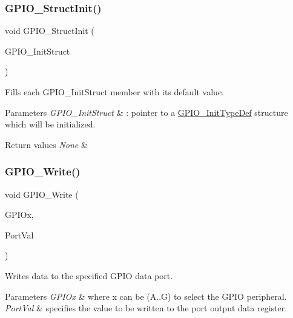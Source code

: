 \subsubsection{\texorpdfstring{GPIO\_StructInit()}{GPIO\_StructInit()}}
{\footnotesize\ttfamily void G\+P\+I\+O\+\_\+\+Struct\+Init (\begin{DoxyParamCaption}\item[{\mbox{\hyperlink{struct_g_p_i_o___init_type_def}{G\+P\+I\+O\+\_\+\+Init\+Type\+Def}} $\ast$}]{G\+P\+I\+O\+\_\+\+Init\+Struct }\end{DoxyParamCaption})}



Fills each G\+P\+I\+O\+\_\+\+Init\+Struct member with its default value. 


\begin{DoxyParams}{Parameters}
{\em G\+P\+I\+O\+\_\+\+Init\+Struct} & \+: pointer to a \mbox{\hyperlink{struct_g_p_i_o___init_type_def}{G\+P\+I\+O\+\_\+\+Init\+Type\+Def}} structure which will be initialized. \\
\hline
\end{DoxyParams}

\begin{DoxyRetVals}{Return values}
{\em None} & \\
\hline
\end{DoxyRetVals}
\mbox{\label{group___g_p_i_o___private___functions_gaa925f19c8547a00c7a0c269a84873bf9}} 
\subsubsection{\texorpdfstring{GPIO\_Write()}{GPIO\_Write()}}
{\footnotesize\ttfamily void G\+P\+I\+O\+\_\+\+Write (\begin{DoxyParamCaption}\item[{\mbox{\hyperlink{struct_g_p_i_o___type_def}{G\+P\+I\+O\+\_\+\+Type\+Def}} $\ast$}]{G\+P\+I\+Ox,  }\item[{uint16\+\_\+t}]{Port\+Val }\end{DoxyParamCaption})}



Writes data to the specified G\+P\+IO data port. 


\begin{DoxyParams}{Parameters}
{\em G\+P\+I\+Ox} & where x can be (A..G) to select the G\+P\+IO peripheral. \\
\hline
{\em Port\+Val} & specifies the value to be written to the port output data register. \\
\hline
\end{DoxyParams}

